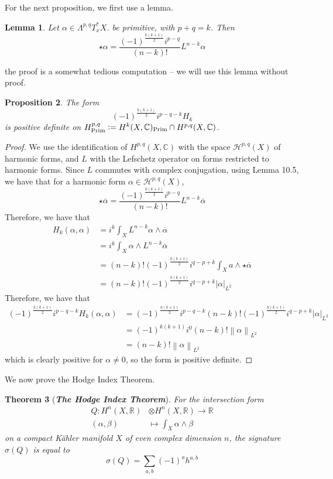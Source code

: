 \documentclass[psamsfonts, 12pt]{amsart}
\newtheorem{thm}{Theorem}[section]
\newtheorem{prop}[thm]{Proposition}
\newtheorem{lem}[thm]{Lemma}
\theoremstyle{definition}
\theoremstyle{remark}
\newcommand{\R}{\mathbb{R}}
\newcommand{\ib}[1]{\textbf{\textit{#1}}}
\newcommand{\C}{\mathbb{C}}
\newcommand{\norm}[1]{\left\lVert#1\right\rVert}
\newcommand{\defeq}{\vcentcolon=}
\begin{document}
%
For the next proposition, we first use a lemma.
%
\begin{lem}
Let $\alpha \in \Lambda^{p,q}T^*_xX$. be primitive, with $p+q=k$. Then
\[
\star\alpha = \frac{(-1)^{\frac{k(k+1)}{2}}i^{p-q}}{(n-k)!}L^{n-k}\alpha
\]
\end{lem}
%
the proof is a somewhat tedious computation -- we will use this lemma without proof.
%
\begin{prop}
The form
\[
(-1)^{\frac{k(k+1)}{2}}i^{p-q-k}H_k
\]
is positive definite on
$H^{p,q}_{\mathrm{Prim}} \defeq H^k(X,\C)_{\mathrm{Prim}} \cap H^{p,q}(X,\C)$.
\end{prop}
%
\begin{proof}
We use the identification of $H^{p,q}(X,\C)$ with the space $\mathcal{H}^{p,q}(X)$ of
harmonic forms, and $L$ with the Lefschetz operator on forms restricted to harmonic
forms. Since $L$ commutes with complex conjugation, using Lemma 10.5, we have that for
a harmonic form $\alpha \in \mathcal{H}^{p,q}(X)$,
\[
\star\overline{\alpha}
= \frac{(-1)^{\frac{k(k+1)}{2}}i^{p-q}}{(n-k)!}L^{n-k}\overline{\alpha}
\]
Therefore, we have that
\begin{align*}
H_k(\alpha,\alpha) &= i^k\int_X L^{n-k}\alpha \wedge \overline{\alpha} \\
&= i^k\int_X \alpha \wedge L^{n-k}\overline{\alpha} \\
&= (n-k)!(-1)^{\frac{k(k+1)}{2}}i^{q-p+k} \int_X a\wedge\star\overline{\alpha} \\
&= (n-k)!(-1)^{\frac{k(k+1)}{2}}i^{q-p+k} |\alpha|_{L^2}
\end{align*}
Therefore, we have that
\begin{align*}
(-1)^{\frac{k(k+1)}{2}}i^{p-q-k}H_k(\alpha,\alpha)
&= (-1)^{\frac{k(k+1)}{2}}i^{p-q-k}(n-k)
!(-1)^{\frac{k(k+1)}{2}}i^{q-p+k}|\alpha|_{L^2}\\
&= (-1)^{k(k+1)}i^{0}(n-k)!\norm{\alpha}_{L^2} \\
&= (n-k)!\norm{\alpha}_{L^2}
\end{align*}
which is clearly positive for $\alpha \neq 0$, so the form is positive definite.
\end{proof}
%
We now prove the Hodge Index Theorem.
%
\begin{thm}[\ib{The Hodge Index Theorem}]
For the intersection form
\begin{align*}
Q : H^n(X,\R) &\otimes H^n(X, \R) \to \R \\
(\alpha,\beta) &\mapsto \int_X \alpha \wedge \beta
\end{align*}
on a compact K\"ahler manifold $X$ of even complex dimension $n$, the signature
$\sigma(Q)$ is equal to
\[
\sigma(Q) = \sum_{a,b}(-1)^ah^{a,b}
\]
\end{thm}
\end{document}
